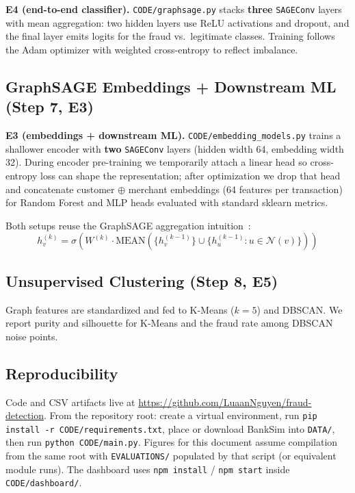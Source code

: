 \documentclass[conference]{IEEEtran}
\begin{document}
\textbf{E4 (end-to-end classifier).} \texttt{CODE/graphsage.py} stacks \textbf{three} \texttt{SAGEConv} layers with mean aggregation: two hidden layers use ReLU activations and dropout, and the final layer emits logits for the fraud vs.\ legitimate classes. Training follows the Adam optimizer with weighted cross-entropy to reflect imbalance.

\subsection{GraphSAGE Embeddings + Downstream ML (Step 7, E3)}

\textbf{E3 (embeddings + downstream ML).} \texttt{CODE/embedding\_models.py} trains a shallower encoder with \textbf{two} \texttt{SAGEConv} layers (hidden width 64, embedding width 32). During encoder pre-training we temporarily attach a linear head so cross-entropy loss can shape the representation; after optimization we drop that head and concatenate customer $\oplus$ merchant embeddings (64 features per transaction) for Random Forest and MLP heads evaluated with standard sklearn metrics.

Both setups reuse the GraphSAGE aggregation intuition~\cite{b6}:
\begin{equation}
h_v^{(k)} = \sigma\!\left(W^{(k)} \cdot \mathrm{MEAN}\!\left(\{h_v^{(k-1)}\} \cup \{h_u^{(k-1)} : u \in \mathcal{N}(v)\}\right)\right)
\end{equation}

\subsection{Unsupervised Clustering (Step 8, E5)}

Graph features are standardized and fed to K-Means ($k{=}5$) and DBSCAN. We report purity and silhouette for K-Means and the fraud rate among DBSCAN noise points.

\subsection{Reproducibility}
\label{sec:repro}
Code and CSV artifacts live at \url{https://github.com/LuaanNguyen/fraud-detection}. From the repository root: create a virtual environment, run \texttt{pip install -r CODE/requirements.txt}, place or download BankSim into \texttt{DATA/}, then run \texttt{python CODE/main.py}. Figures for this document assume compilation from the same root with \texttt{EVALUATIONS/} populated by that script (or equivalent module runs). The dashboard uses \texttt{npm install} / \texttt{npm start} inside \texttt{CODE/dashboard/}.
\end{document}
